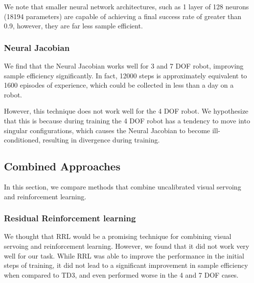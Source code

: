 \documentclass[letterpaper, 10 pt, conference]{ieeeconf}  %
\begin{document}
We note that smaller neural network architectures, such as 1 layer of 128 neurons (18194 parameters) are capable of
achieving a final success rate of greater than 0.9, however, they are far less
sample efficient.

\subsubsection{Neural Jacobian}

We find that the Neural Jacobian works well for 3 and 7 DOF robot, improving
sample efficiency significantly. In fact, 12000 steps is approximately
equivalent to 1600 episodes of experience, which could be collected in less
than a day on a robot.

However, this technique does not work well for
the 4 DOF robot. We hypothesize that this is because during training the 4 DOF
robot has a tendency to move into singular configurations, which causes the
Neural Jacobian to become ill-conditioned, resulting in divergence during
training.

\subsection{Combined Approaches}
In this section, we compare methods that combine uncalibrated visual servoing
and reinforcement learning.

\addtolength{\textheight}{-1cm}

\subsubsection{Residual Reinforcement learning}

We thought that RRL would be a promising technique for combining visual servoing
and reinforcement learning. However, we found that it did not work very well for
our task. While RRL was able to improve the performance in the initial steps
of training, it did not lead to a significant improvement in sample efficiency
when compared to TD3, and even performed worse in the 4 and 7 DOF cases.
\end{document}
